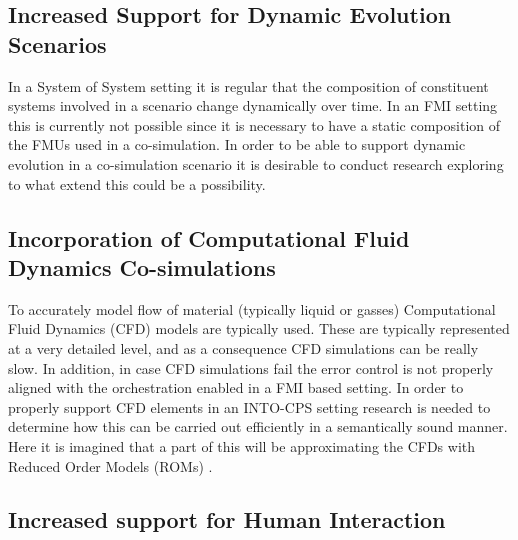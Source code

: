 
\subsection{Increased Support for Dynamic Evolution Scenarios}

In a System of System setting it is regular that the composition of constituent systems involved in a scenario change dynamically over time. In an FMI setting this is currently not possible since it is necessary to have a static composition of the FMUs used in a co-simulation. In order to be able to support dynamic evolution in a co-simulation scenario it is desirable to conduct research exploring to what extend this could be a possibility.


\subsection{Incorporation of Computational Fluid Dynamics Co-simulations}

To accurately model flow of material (typically liquid or gasses) Computational Fluid Dynamics (CFD) models are typically used. These are typically represented at a very detailed level, and as a consequence CFD simulations can be really slow. In addition, in case CFD simulations fail the error control is not properly aligned with the orchestration enabled in a FMI based setting. In order to properly support CFD elements in an INTO-CPS setting research is needed to determine how this can be carried out efficiently in a semantically sound manner. Here it is imagined that a part of this will be approximating the CFDs with Reduced Order Models (ROMs) \cite{Carlberg&13}.


\subsection{Increased support for Human Interaction}

